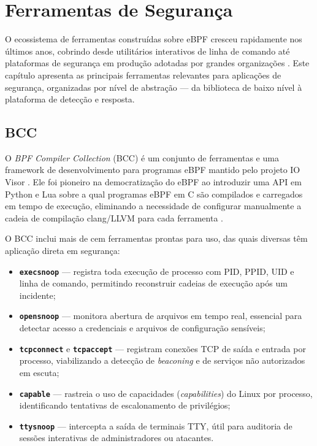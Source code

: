 \chapter{Ferramentas de Segurança}
\label{cap:ferramentas-seguranca}

O ecossistema de ferramentas construídas sobre eBPF cresceu rapidamente nos últimos
anos, cobrindo desde utilitários interativos de linha de comando até plataformas
de segurança em produção adotadas por grandes organizações \cite{gregg2019}.
Este capítulo apresenta as principais ferramentas relevantes para aplicações de
segurança, organizadas por nível de abstração --- da biblioteca de baixo nível à
plataforma de detecção e resposta.

\section{BCC}

O \textit{BPF Compiler Collection} (BCC) é um conjunto de ferramentas e uma
framework de desenvolvimento para programas eBPF mantido pelo projeto IO Visor
\cite{bcc}.
Ele foi pioneiro na democratização do eBPF ao introduzir uma API em Python e Lua
sobre a qual programas eBPF em C são compilados e carregados em tempo de execução,
eliminando a necessidade de configurar manualmente a cadeia de compilação
clang/LLVM para cada ferramenta \cite{gregg2019}.

O BCC inclui mais de cem ferramentas prontas para uso, das quais diversas têm
aplicação direta em segurança:

\begin{itemize}
  \item \textbf{\texttt{execsnoop}} --- registra toda execução de processo com PID,
        PPID, UID e linha de comando, permitindo reconstruir cadeias de execução
        após um incidente;
  \item \textbf{\texttt{opensnoop}} --- monitora abertura de arquivos em tempo real,
        essencial para detectar acesso a credenciais e arquivos de configuração
        sensíveis;
  \item \textbf{\texttt{tcpconnect}} e \textbf{\texttt{tcpaccept}} --- registram
        conexões TCP de saída e entrada por processo, viabilizando a detecção de
        \textit{beaconing} e de serviços não autorizados em escuta;
  \item \textbf{\texttt{capable}} --- rastreia o uso de capacidades
        (\textit{capabilities}) do Linux por processo, identificando tentativas
        de escalonamento de privilégios;
  \item \textbf{\texttt{ttysnoop}} --- intercepta a saída de terminais TTY, útil
        para auditoria de sessões interativas de administradores ou atacantes.
\end{itemize}

